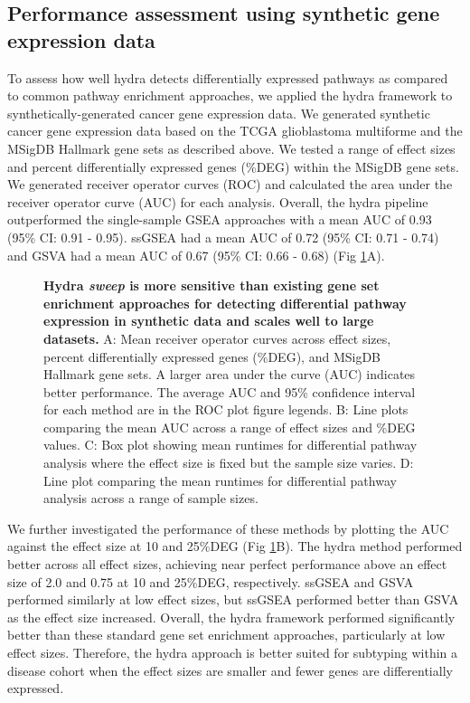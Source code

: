 \documentclass[10pt,letterpaper]{article}
\begin{document}
\subsection*{Performance assessment using synthetic gene expression data}
To assess how well hydra detects differentially expressed pathways as compared to common pathway enrichment approaches, we applied the hydra framework to synthetically-generated cancer gene expression data. We generated synthetic cancer gene expression data based on the TCGA glioblastoma multiforme and the MSigDB Hallmark gene sets as described above. We tested a range of effect sizes and percent differentially expressed genes (\%DEG) within the MSigDB gene sets. We generated receiver operator curves (ROC) and calculated the area under the receiver operator curve (AUC) for each analysis. Overall, the hydra pipeline outperformed the single-sample GSEA approaches with a mean AUC of 0.93 (95\% CI: 0.91 - 0.95). ssGSEA had a mean AUC of 0.72 (95\% CI: 0.71 - 0.74) and GSVA had a mean AUC of 0.67 (95\% CI: 0.66 - 0.68) (Fig \ref{rocplot}A).

\begin{figure}[!h]
	\caption{{\bf Hydra \textit{sweep} is more sensitive than existing gene set enrichment approaches for detecting differential pathway expression in synthetic data and scales well to large datasets.}
		A: Mean receiver operator curves across effect sizes, percent differentially expressed genes (\%DEG), and MSigDB Hallmark gene sets. A larger area under the curve (AUC) indicates better performance. The average AUC and 95\% confidence interval for each method are in the ROC plot figure legends. B: Line plots comparing the mean AUC across a range of effect sizes and \%DEG values. C: Box plot showing mean runtimes for differential pathway analysis where the effect size is fixed but the sample size varies. D: Line plot comparing the mean runtimes for differential pathway analysis across a range of sample sizes.
		\label{rocplot}}
\end{figure}

We further investigated the performance of these methods by plotting the AUC against the effect size at 10 and 25\%DEG (Fig \ref{rocplot}B). The hydra method performed better across all effect sizes, achieving near perfect performance above an effect size of 2.0 and 0.75 at 10 and 25\%DEG, respectively. ssGSEA and GSVA performed similarly at low effect sizes, but ssGSEA performed better than GSVA as the effect size increased. Overall, the hydra framework performed significantly better than these standard gene set enrichment approaches, particularly at low effect sizes. Therefore, the hydra approach is better suited for subtyping within a disease cohort when the effect sizes are smaller and fewer genes are differentially expressed.
\end{document}
